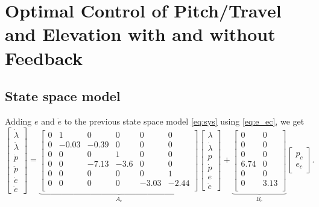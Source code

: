 \section{Optimal Control of Pitch/Travel and Elevation with and without Feedback}\label{sec:prob4}
\label{text:problem4}

\subsection{State space model}
Adding $e$ and $\dot{e}$ to the previous state space model \eqref{eq:sys} using \eqref{eq:e_ec}, we get
\begin{equation}
	\begin{bmatrix}
		\dot{\lambda}\\
		\ddot{\lambda}	\\
		\dot{p}	\\
		\ddot{p}\\
		\dot{e}	\\
		\ddot{e}
	\end{bmatrix} = 
	\underbrace{
	\begin{bmatrix}
		0 & 1 & 0 & 0 & 0  & 0 \\
		0 & -0.03 & -0.39 & 0 & 0 & 0 \\
		0 & 0 & 0 & 1 & 0 & 0 \\
		0 & 0 & -7.13 & -3.6 & 0 & 0 \\
		0 & 0 & 0 & 0 & 0 & 1 \\
		0 & 0 & 0 & 0 & -3.03 & -2.44 \\
	\end{bmatrix}}_{A_c}
	\begin{bmatrix}
		\lambda	\\
		\dot{\lambda}\\
		p		\\
		\dot{p} \\
		e		\\
		\dot{e}
	\end{bmatrix} +
	\underbrace{
	\begin{bmatrix}
		0 & 0\\
		0 & 0\\
		0 & 0\\
		6.74 & 0\\
		0 & 0 \\
		0 & 3.13 \\
	\end{bmatrix}}_{B_c}
	\begin{bmatrix}
	p_c \\
	e_c
	\end{bmatrix}.
	\label{eq:ex_sys}
\end{equation}

